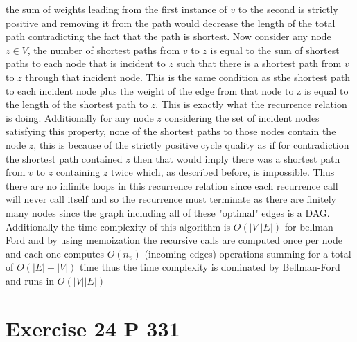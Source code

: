 \documentclass{amsart}
\begin{document}
the sum of weights leading from the first instance of $v$ to the second is strictly positive and removing it from the path would decrease the length of the total path contradicting the fact 
that the path is shortest.
Now consider any node $z \in V$, the number of shortest paths from $v$ to $z$ is equal to the sum of shortest paths to each node that is incident to $z$ such that there is a shortest path from $v$ to $z$ through that incident node.
This is the same condition as sthe shortest path to each incident node plus the weight of the edge from that node to z is equal to the length of the shortest path to $z$. This is exactly what the recurrence relation is doing.
Additionally for any node $z$ considering the set of incident nodes satisfying this property, none of the shortest paths to those nodes contain the node $z$, this is because of the strictly positive
cycle quality as if for contradiction the shortest path contained $z$ then that would imply there was a shortest path from $v$ to $z$ containing $z$ twice which, as described before, is impossible.
Thus there are no infinite loops in this recurrence relation since each recurrence call will never call itself and so the recurrence must terminate as there are finitely many nodes since the graph including all of these "optimal" edges is a DAG.
Additionally the time complexity of this algorithm is $O(|V||E|)$ for bellman-Ford and by using memoization the recursive calls are computed once per node and each one computes $O(n_v)$ (incoming edges) operations summing for a total of
 $O(|E| + |V|)$ time thus the time complexity is dominated by Bellman-Ford and runs in $O(|V||E|)$


\section{Exercise 24 P 331}
\end{document}
